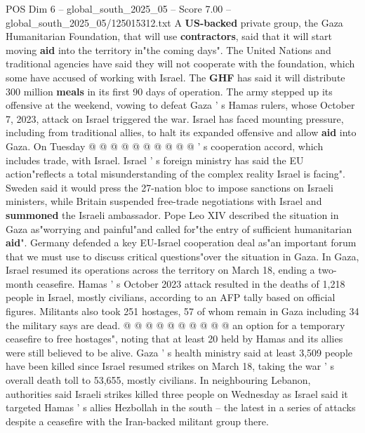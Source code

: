\begin{textsample}{POS Dim 6 – global\_south\_2025\_05 – Score 7.00 – global\_south\_2025\_05/125015312.txt}
A \textbf{US-backed} private group, the Gaza Humanitarian Foundation, that will use \textbf{contractors}, said that it will start moving \textbf{aid} into the territory in"the coming days".
The United Nations and traditional agencies have said they will not cooperate with the foundation, which some have accused of working with Israel.
The \textbf{GHF} has said it will distribute 300 million \textbf{meals} in its first 90 days of operation.
The army stepped up its offensive at the weekend, vowing to defeat Gaza ' s Hamas rulers, whose October 7, 2023, attack on Israel triggered the war.
Israel has faced mounting pressure, including from traditional allies, to halt its expanded offensive and allow \textbf{aid} into Gaza.
On Tuesday @ @ @ @ @ @ @ @ @ @ ' s cooperation accord, which includes trade, with Israel.
Israel ' s foreign ministry has said the EU action"reflects a total misunderstanding of the complex reality Israel is facing".
Sweden said it would press the 27-nation bloc to impose sanctions on Israeli ministers, while Britain suspended free-trade negotiations with Israel and \textbf{summoned} the Israeli ambassador.
Pope Leo XIV described the situation in Gaza as"worrying and painful"and called for"the entry of sufficient humanitarian \textbf{aid}".
Germany defended a key EU-Israel cooperation deal as"an important forum that we must use to discuss critical questions"over the situation in Gaza.
In Gaza, Israel resumed its operations across the territory on March 18, ending a two-month ceasefire.
Hamas ' s October 2023 attack resulted in the deaths of 1,218 people in Israel, mostly civilians, according to an AFP tally based on official figures.
Militants also took 251 hostages, 57 of whom remain in Gaza including 34 the military says are dead. @ @ @ @ @ @ @ @ @ @ an option for a temporary ceasefire to free hostages", noting that at least 20 held by Hamas and its allies were still believed to be alive.
Gaza ' s health ministry said at least 3,509 people have been killed since Israel resumed strikes on March 18, taking the war ' s overall death toll to 53,655, mostly civilians.
In neighbouring Lebanon, authorities said Israeli strikes killed three people on Wednesday as Israel said it targeted Hamas ' s allies Hezbollah in the south -- the latest in a series of attacks despite a ceasefire with the Iran-backed militant group there.

\end{textsample}
